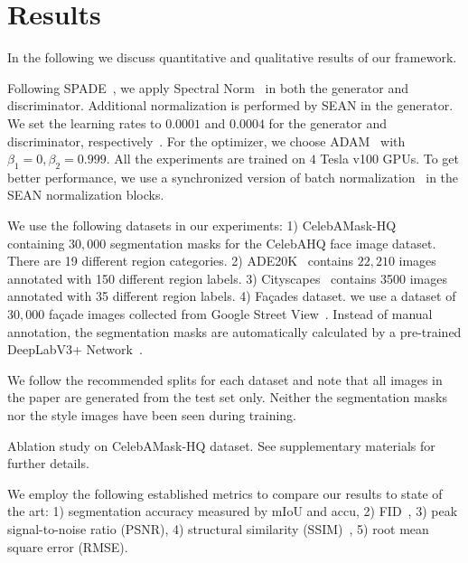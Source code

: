 \documentclass[10pt,twocolumn,letterpaper]{article}
\def\facade{fa\c{c}ade\xspace}
\def\Facades{Fa\c{c}ades\xspace}
\begin{document}
\section{Results}

In the following we discuss quantitative and qualitative results of our framework.

\vspace*{2mm} Following SPADE~\cite{park2019SPADE}, we apply Spectral Norm~\cite{miyato2018spectral} in both the generator and discriminator. Additional normalization is performed by SEAN in the generator. We set the learning rates to $0.0001$ and $0.0004$ for the generator and discriminator, respectively~\cite{heusel2017gans}. For the optimizer, we choose ADAM~\cite{kingma2014adam} with $\beta_{1}=0, \beta_{2}=0.999$. All the experiments are trained on $4$ Tesla v100 GPUs. To get better performance, we use a synchronized version of batch normalization~\cite{Zhang_2018_CVPR} in the SEAN normalization blocks.

\vspace*{2mm} We use the following datasets in our experiments: 1) CelebAMask-HQ~\cite{CelebAMask-HQ,karras2017progressive,liu2015faceattributes} containing $30,000$ segmentation masks for the CelebAHQ face image dataset. There are 19 different region categories.
2) ADE20K~\cite{zhou2017scene} contains $22,210$ images annotated with 150 different region labels.
3) Cityscapes~\cite{Cordts2016Cityscapes} contains 3500 images annotated with 35 different region labels. 
4) \Facades dataset. we use a dataset of $30,000$ \facade images collected from Google Street View~\cite{anguelov2010google}.  Instead of manual annotation, the segmentation masks are automatically calculated by a pre-trained DeepLabV3+ Network~\cite{chen2018encoderdecoder}.

We follow the recommended splits for each dataset and note that all images in the paper are generated from the test set only. Neither the segmentation masks nor the style images have been seen during training.



\begin{table}[hpb]

\caption{Ablation study on CelebAMask-HQ dataset. See supplementary materials for further details.} 
\label{tab:ablation study table}
\end{table}


\vspace*{2mm} We employ the following established metrics to compare our results to state of the art: 1) segmentation accuracy measured by \ac{mIoU} and \ac{accu}, 2) FID~\cite{heusel2017gans}, 3) peak signal-to-noise ratio (PSNR), 4) structural similarity (SSIM)~\cite{Wang04imagequality}, 5) root mean square error (RMSE).
\end{document}
